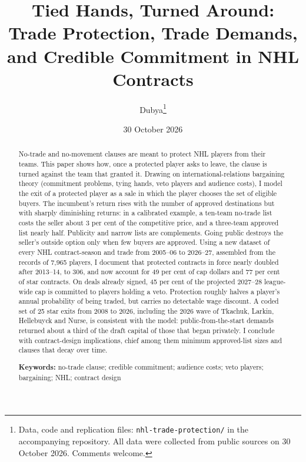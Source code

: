 \documentclass[11pt]{article}
\title{Tied Hands, Turned Around:\\[2pt] \large Trade Protection, Trade Demands, and Credible Commitment in NHL Contracts}
\author{Dubya\thanks{Data, code and replication files: \texttt{nhl-trade-protection/} in the accompanying repository. All data were collected from public sources on 30 October 2026. Comments welcome.}}
\date{30 October 2026}
\begin{document}
\maketitle

\begin{abstract}\noindent
No-trade and no-movement clauses are meant to protect NHL players from their teams. This paper shows how, once a protected player asks to leave, the clause is turned against the team that granted it. Drawing on international-relations bargaining theory (commitment problems, tying hands, veto players and audience costs), I model the exit of a protected player as a sale in which the player chooses the set of eligible buyers. The incumbent's return rises with the number of approved destinations but with sharply diminishing returns: in a calibrated example, a ten-team no-trade list costs the seller about 3 per cent of the competitive price, and a three-team approved list nearly half. Publicity and narrow lists are complements. Going public destroys the seller's outside option only when few buyers are approved. Using a new dataset of every NHL contract-season and trade from 2005--06 to 2026--27, assembled from the records of 7,965 players, I document that protected contracts in force nearly doubled after 2013--14, to 306, and now account for 49 per cent of cap dollars and 77 per cent of star contracts. On deals already signed, 45 per cent of the projected 2027--28 league-wide cap is committed to players holding a veto. Protection roughly halves a player's annual probability of being traded, but carries no detectable wage discount. A coded set of 25 star exits from 2008 to 2026, including the 2026 wave of Tkachuk, Larkin, Hellebuyck and Nurse, is consistent with the model: public-from-the-start demands returned about a third of the draft capital of those that began privately. I conclude with contract-design implications, chief among them minimum approved-list sizes and clauses that decay over time.

\medskip\noindent\textbf{Keywords:} no-trade clause; credible commitment; audience costs; veto players; bargaining; NHL; contract design
\end{abstract}












\end{document}
